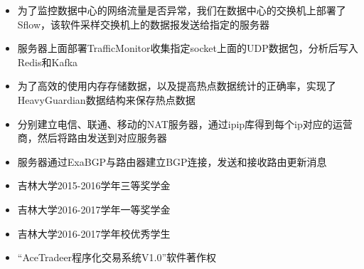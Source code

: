 \documentclass[12pt,a4paper,ragged2e]{altacv}
\begin{document}

\setlength{\baselineskip}{18pt}
\begin{itemize}
\justifying
\item 为了监控数据中心的网络流量是否异常，我们在数据中心的交换机上部署了Sflow，该软件采样交换机上的数据报发送给指定的服务器
\item 服务器上面部署TrafficMonitor收集指定socket上面的UDP数据包，分析后写入Redis和Kafka
\item 为了高效的使用内存存储数据，以及提高热点数据统计的正确率，实现了HeavyGuardian数据结构来保存热点数据
\end{itemize}

\setlength{\baselineskip}{18pt}
\begin{itemize}
\justifying
\item 分别建立电信、联通、移动的NAT服务器，通过ipip库得到每个ip对应的运营商，然后将路由发送到对应服务器
\item 服务器通过ExaBGP与路由器建立BGP连接，发送和接收路由更新消息
\end{itemize}


\begin{itemize}
\item 吉林大学2015-2016学年三等奖学金
\item 吉林大学2016-2017学年一等奖学金
\item 吉林大学2016-2017学年校优秀学生
\item “AceTradeer程序化交易系统V1.0”软件著作权
\end{itemize}


\clearpage
\nocite{*}
\end{document}
